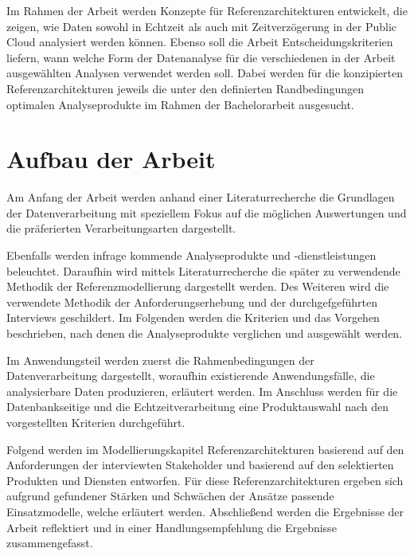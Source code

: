 Im Rahmen der Arbeit werden Konzepte für Referenzarchitekturen entwickelt, die zeigen, wie Daten sowohl in Echtzeit als auch mit Zeitverzögerung in der Public Cloud analysiert werden können. 
Ebenso soll die Arbeit Entscheidungskriterien liefern, wann welche Form der Datenanalyse für die verschiedenen in der Arbeit ausgewählten Analysen verwendet werden soll. 
Dabei werden für die konzipierten Referenzarchitekturen jeweils die unter den definierten Randbedingungen optimalen Analyseprodukte im Rahmen der Bachelorarbeit ausgesucht.

\section{Aufbau der Arbeit}

Am Anfang der Arbeit werden anhand einer Literaturrecherche die Grundlagen der Datenverarbeitung mit speziellem Fokus auf die möglichen Auswertungen und die präferierten Verarbeitungsarten dargestellt. 

Ebenfalls werden infrage kommende Analyseprodukte und -dienstleistungen beleuchtet. 
Daraufhin wird mittels Literaturrecherche die später zu verwendende Methodik der Referenzmodellierung dargestellt werden. 
Des Weiteren wird die verwendete Methodik der Anforderungserhebung und der durchgefgeführten Interviews geschildert. 
Im Folgenden werden die Kriterien und das Vorgehen beschrieben, nach denen die Analyseprodukte verglichen und ausgewählt werden. 

Im Anwendungsteil werden zuerst die Rahmenbedingungen der Datenverarbeitung dargestellt, woraufhin existierende Anwendungsfälle, die analysierbare Daten produzieren, erläutert werden. 
Im Anschluss werden für die Datenbankseitige und die Echtzeitverarbeitung eine Produktauswahl nach den vorgestellten Kriterien durchgeführt. 

Folgend werden im Modellierungskapitel Referenzarchitekturen basierend auf den Anforderungen der interviewten Stakeholder und basierend auf den selektierten Produkten und Diensten entworfen. Für diese Referenzarchitekturen ergeben sich aufgrund gefundener Stärken und
Schwächen der Ansätze passende Einsatzmodelle, welche erläutert werden. Abschließend werden die Ergebnisse der Arbeit reflektiert und in einer Handlungsempfehlung die Ergebnisse zusammengefasst.